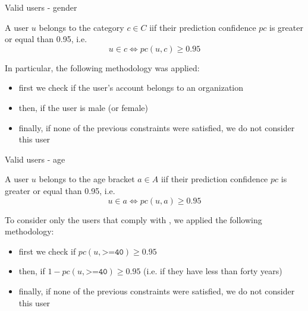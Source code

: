 \documentclass[8pt]{beamer}  %
\begin{document}
\begin{frame}{Valid users - gender}

    \begin{definition}
    \label{def:valid-users}
    	A user \(u\) belongs to the category \(c \in C\) iif their prediction confidence \(pc\) is greater or equal than 0.95, i.e.
    	\[u \in c \Longleftrightarrow pc(u, c) \geq 0.95\]
    \end{definition}
    	
    In particular, the following methodology was applied:
    	
    \begin{itemize}
    	\item first we check if the user's account belongs to an organization
    	\item then, if the user is male (or female)
    	\item finally, if none of the previous constraints were satisfied, we do not consider this user
    \end{itemize}
    
\end{frame}

\begin{frame}{Valid users - age}

    \begin{definition}
    \label{def:valid-users-age}
    	A user \(u\) belongs to the age bracket \(a \in A\) iif their prediction confidence \(pc\) is greater or equal than 0.95, i.e.
    	\[u \in a \Longleftrightarrow pc(u, a) \geq 0.95\]
    \end{definition}
    
    To consider only the users that comply with , we applied the following methodology:
    
    \begin{itemize}
    	\item first we check if \(pc(u, \texttt{>=40}) \geq 0.95\)
    	\item then, if \(1 - pc(u, \texttt{>=40}) \geq 0.95\) (i.e. if they have less than forty years)
    	\item finally, if none of the previous constraints were satisfied, we do not consider this user
    \end{itemize}
    
\end{frame}
\end{document}
